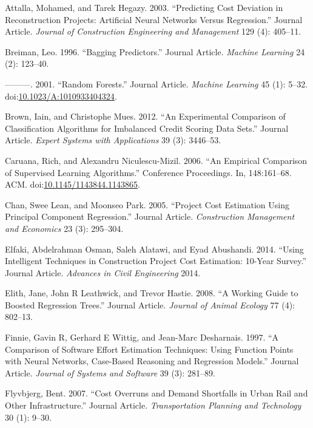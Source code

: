 \documentclass[]{elsarticle} %
\begin{document}
\hypertarget{refs}{}
\hypertarget{ref-Attalla2003}{}
Attalla, Mohamed, and Tarek Hegazy. 2003. ``Predicting Cost Deviation in
Reconstruction Projects: Artificial Neural Networks Versus Regression.''
Journal Article. \emph{Journal of Construction Engineering and
Management} 129 (4): 405--11.

\hypertarget{ref-Breiman1996}{}
Breiman, Leo. 1996. ``Bagging Predictors.'' Journal Article.
\emph{Machine Learning} 24 (2): 123--40.

\hypertarget{ref-Breiman2001a}{}
---------. 2001. ``Random Forests.'' Journal Article. \emph{Machine
Learning} 45 (1): 5--32.
doi:\href{https://doi.org/10.1023/A:1010933404324}{10.1023/A:1010933404324}.

\hypertarget{ref-Brown2012}{}
Brown, Iain, and Christophe Mues. 2012. ``An Experimental Comparison of
Classification Algorithms for Imbalanced Credit Scoring Data Sets.''
Journal Article. \emph{Expert Systems with Applications} 39 (3):
3446--53.

\hypertarget{ref-Caruana2006}{}
Caruana, Rich, and Alexandru Niculescu-Mizil. 2006. ``An Empirical
Comparison of Supervised Learning Algorithms.'' Conference Proceedings.
In, 148:161--68. ACM.
doi:\href{https://doi.org/10.1145/1143844.1143865}{10.1145/1143844.1143865}.

\hypertarget{ref-Chan2005}{}
Chan, Swee Lean, and Moonseo Park. 2005. ``Project Cost Estimation Using
Principal Component Regression.'' Journal Article. \emph{Construction
Management and Economics} 23 (3): 295--304.

\hypertarget{ref-Elfaki2014}{}
Elfaki, Abdelrahman Osman, Saleh Alatawi, and Eyad Abushandi. 2014.
``Using Intelligent Techniques in Construction Project Cost Estimation:
10-Year Survey.'' Journal Article. \emph{Advances in Civil Engineering}
2014.

\hypertarget{ref-Elith2008}{}
Elith, Jane, John R Leathwick, and Trevor Hastie. 2008. ``A Working
Guide to Boosted Regression Trees.'' Journal Article. \emph{Journal of
Animal Ecology} 77 (4): 802--13.

\hypertarget{ref-Finnie1997}{}
Finnie, Gavin R, Gerhard E Wittig, and Jean-Marc Desharnais. 1997. ``A
Comparison of Software Effort Estimation Techniques: Using Function
Points with Neural Networks, Case-Based Reasoning and Regression
Models.'' Journal Article. \emph{Journal of Systems and Software} 39
(3): 281--89.

\hypertarget{ref-Flyvbjerg2007}{}
Flyvbjerg, Bent. 2007. ``Cost Overruns and Demand Shortfalls in Urban
Rail and Other Infrastructure.'' Journal Article. \emph{Transportation
Planning and Technology} 30 (1): 9--30.
\end{document}
